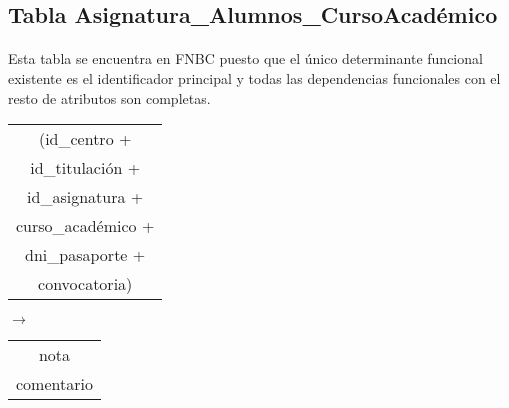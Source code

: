 \subsection{Tabla Asignatura\_Alumnos\_CursoAcadémico}

  \paragraph{}Esta tabla se encuentra en FNBC puesto que el único determinante
  funcional existente es el identificador principal y todas las dependencias
  funcionales con el resto de atributos son completas.

  \begin{center}
    \begin{minipage}{4.1cm}{\begin{flushright}\begin{tabular}{ | c | }
                  \hline
                  (id\_centro + \\
                  id\_titulación + \\
                  id\_asignatura + \\
                  curso\_académico + \\
                  dni\_pasaporte + \\
                  convocatoria) \\
                  \hline
                 \end{tabular}\end{flushright} }
    \end{minipage}
    \begin{minipage}{0.7cm}{$\longrightarrow$}
    \end{minipage}
    \begin{minipage}{5.9cm}{\begin{tabular}{ | c | }
                  \hline
                  nota \\
                  comentario \\
                  \hline
                 \end{tabular} }
    \end{minipage}
  \end{center}
